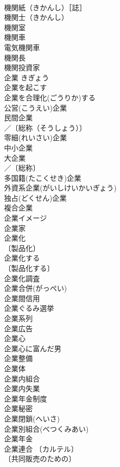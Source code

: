 \documentclass[8pt]{extreport}
\begin{document}
\begin{CJK}{UTF8}{min}
\\	機関紙（きかんし）［誌］ 
\\	機関士（きかんし） 
\\	機関室 
\\	機関車 
\\	電気機関車 
\\	機関長 
\\	機関投資家 
\\	企業	きぎょう	
\\	企業を起こす 
\\	企業を合理化(ごうりか)する 
\\	公営(こうえい)企業 
\\	民間企業 
\\	／〔総称（そうしょう）〕
\\	零細(れいさい)企業 
\\	中小企業 
\\	大企業 
\\	／〔総称〕
\\	多国籍(たこくせき)企業 
\\	外資系企業(がいしけいかいぎょう) 
\\	独占(どくせん)企業 
\\	複合企業 
\\	企業イメージ 
\\	企業家 
\\	企業化 
\\	〔製品化〕
\\	企業化する 
\\	〔製品化する〕
\\	企業化調査 
\\	企業合併(がっぺい) 
\\	企業間信用 
\\	企業ぐるみ選挙 
\\	企業系列 
\\	企業広告 
\\	企業心 
\\	企業心に富んだ男 
\\	企業整備 
\\	企業体 
\\	企業内組合 
\\	企業内失業 
\\	企業年金制度 
\\	企業秘密 
\\	企業閉鎖(へいさ) 
\\	企業別組合(べつくみあい) 
\\	企業年金 
\\	企業連合 〔カルテル〕
\\	〔共同販売のための〕

\end{CJK}
\end{document}
